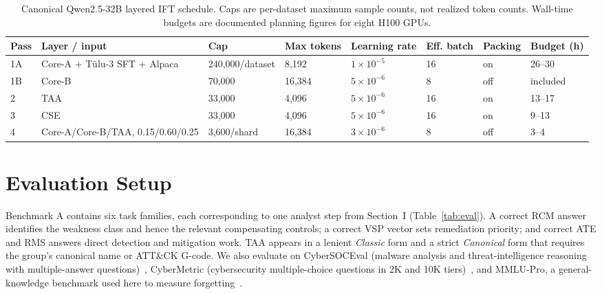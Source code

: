 \documentclass[conference]{IEEEtran}
\begin{document}
\begin{table}[t]
\caption{Canonical Qwen2.5-32B layered IFT schedule. Caps are per-dataset maximum sample counts, not realized token counts. Wall-time budgets are documented planning figures for eight H100 GPUs.}
\label{tab:train}
\centering
\scriptsize
\setlength{\tabcolsep}{3.2pt}
\begin{tabular}{@{}llllllll@{}}
\toprule
Pass & Layer / input & Cap & Max tokens & Learning rate & Eff. batch & Packing & Budget (h) \\
\midrule
1A & Core-A + T\"ulu-3 SFT + Alpaca & 240,000/dataset & 8,192 & $1\times10^{-5}$ & 16 & on & 26--30 \\
1B & Core-B & 70,000 & 16,384 & $5\times10^{-6}$ & 8 & off & included \\
2 & TAA & 33,000 & 4,096 & $5\times10^{-6}$ & 16 & on & 13--17 \\
3 & CSE & 33,000 & 4,096 & $5\times10^{-6}$ & 16 & on & 9--13 \\
4 & Core-A/Core-B/TAA, 0.15/0.60/0.25 & 3,600/shard & 16,384 & $3\times10^{-6}$ & 8 & off & 3--4 \\
\bottomrule
\end{tabular}
\end{table}

\section{Evaluation Setup}\label{sec:eval}
Benchmark A contains six task families, each corresponding to one analyst step from Section~I (Table~\ref{tab:eval}). A correct RCM answer identifies the weakness class and hence the relevant compensating controls; a correct VSP vector sets remediation priority; and correct ATE and RMS answers direct detection and mitigation work. TAA appears in a lenient \emph{Classic} form and a strict \emph{Canonical} form that requires the group's canonical name or ATT\&CK G-code. We also evaluate on CyberSOCEval (malware analysis and threat-intelligence reasoning with multiple-answer questions)~\cite{deason2025cybersoceval}, CyberMetric (cybersecurity multiple-choice questions in 2K and 10K tiers)~\cite{tihanyi2024cybermetric}, and MMLU-Pro, a general-knowledge benchmark used here to measure forgetting~\cite{wang2024mmlupro}.
\end{document}
